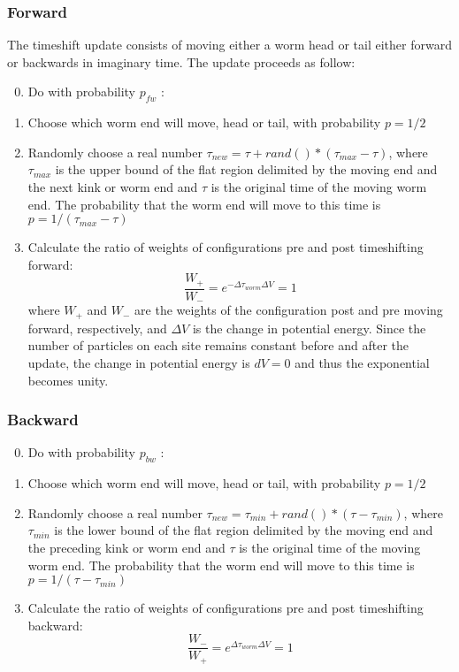 \documentclass[12pt, two sided]{article}
\begin{document}
    \subsubsection{Forward}
    The timeshift update consists of moving either a worm head or tail either forward or backwards in imaginary time. The update proceeds as follow:
    \begin{enumerate}
        \setcounter{enumi}{-1}
        \item Do with probability $p_{fw}$ :
        \item Choose which worm end will move, head or tail, with probability $p = 1/2$
        \item Randomly choose a real number $\tau_{new} = \tau + rand()*(\tau_{max}-\tau)$, where $\tau_{max}$ is the upper bound of the flat region delimited by the moving end and the next kink or worm end and $\tau$ is the original time of the moving worm end. The probability that the worm end will move to this time is $p = 1/(\tau_{max}-\tau)$
        \item Calculate the ratio of weights of configurations pre and post timeshifting forward:
            \begin{equation}
            \frac{W_+}{W_-} = e^{-\Delta\tau_{worm} \Delta V} = 1
            \label{eq:forward_ratios}
            \end{equation}
            where $W_+$ and $W_-$ are the weights of the configuration post and pre moving forward, respectively, and $\Delta V$ is the change in potential energy. Since the number of particles on each site remains constant before and after the update, the change in potential energy is $dV = 0$ and thus the exponential becomes unity.

    \end{enumerate}
    \subsubsection{Backward}
    \begin{enumerate}
        \setcounter{enumi}{-1}
        \item Do with probability $p_{bw}$ :
        \item Choose which worm end will move, head or tail, with probability $p = 1/2$
        \item Randomly choose a real number $\tau_{new} = \tau_{min} + rand()*(\tau-\tau_{min})$, where $\tau_{min}$ is the lower bound of the flat region delimited by the moving end and the preceding kink or worm end and $\tau$ is the original time of the moving worm end. The probability that the worm end will move to this time is $p = 1/(\tau-\tau_{min})$
        \item Calculate the ratio of weights of configurations pre and post timeshifting backward:
            \begin{equation}
            \frac{W_-}{W_+} = e^{\Delta\tau_{worm} \Delta V} = 1
            \label{eq:tsbw_ratios}
            \end{equation}
    \end{enumerate}
\end{document}
